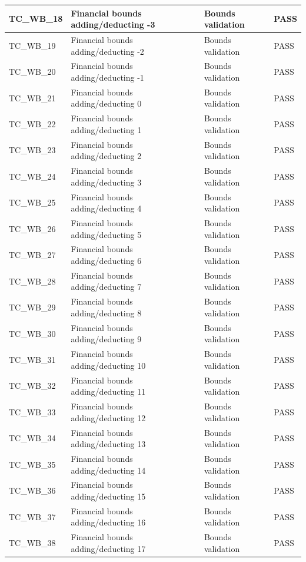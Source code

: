\documentclass{article}
\begin{document}
\begin{longtable}{|p{2cm}|p{8cm}|p{3cm}|p{2cm}|}
\hline
TC\_WB\_18 & Financial bounds adding/deducting -3 & Bounds validation & PASS \\
\hline
TC\_WB\_19 & Financial bounds adding/deducting -2 & Bounds validation & PASS \\
\hline
TC\_WB\_20 & Financial bounds adding/deducting -1 & Bounds validation & PASS \\
\hline
TC\_WB\_21 & Financial bounds adding/deducting 0 & Bounds validation & PASS \\
\hline
TC\_WB\_22 & Financial bounds adding/deducting 1 & Bounds validation & PASS \\
\hline
TC\_WB\_23 & Financial bounds adding/deducting 2 & Bounds validation & PASS \\
\hline
TC\_WB\_24 & Financial bounds adding/deducting 3 & Bounds validation & PASS \\
\hline
TC\_WB\_25 & Financial bounds adding/deducting 4 & Bounds validation & PASS \\
\hline
TC\_WB\_26 & Financial bounds adding/deducting 5 & Bounds validation & PASS \\
\hline
TC\_WB\_27 & Financial bounds adding/deducting 6 & Bounds validation & PASS \\
\hline
TC\_WB\_28 & Financial bounds adding/deducting 7 & Bounds validation & PASS \\
\hline
TC\_WB\_29 & Financial bounds adding/deducting 8 & Bounds validation & PASS \\
\hline
TC\_WB\_30 & Financial bounds adding/deducting 9 & Bounds validation & PASS \\
\hline
TC\_WB\_31 & Financial bounds adding/deducting 10 & Bounds validation & PASS \\
\hline
TC\_WB\_32 & Financial bounds adding/deducting 11 & Bounds validation & PASS \\
\hline
TC\_WB\_33 & Financial bounds adding/deducting 12 & Bounds validation & PASS \\
\hline
TC\_WB\_34 & Financial bounds adding/deducting 13 & Bounds validation & PASS \\
\hline
TC\_WB\_35 & Financial bounds adding/deducting 14 & Bounds validation & PASS \\
\hline
TC\_WB\_36 & Financial bounds adding/deducting 15 & Bounds validation & PASS \\
\hline
TC\_WB\_37 & Financial bounds adding/deducting 16 & Bounds validation & PASS \\
\hline
TC\_WB\_38 & Financial bounds adding/deducting 17 & Bounds validation & PASS \\

\end{longtable}
\end{document}
